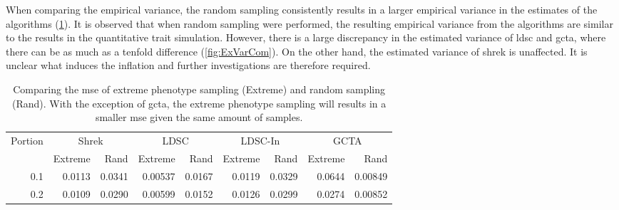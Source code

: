 \documentclass[12pt]{scrbook}
\begin{document}
When comparing the empirical variance, the random sampling consistently results in a larger empirical variance in the estimates of the algorithms (\cref{tab:ratioEx}).	
It is observed that when random sampling were performed, the resulting empirical variance from the algorithms are similar to the results in the quantitative trait simulation. 
However, there is a large discrepancy in the estimated variance of \gls{ldsc} and \gls{gcta}, where there can be as much as a tenfold difference (\cref{fig:ExVarCom}). 
On the other hand, the estimated variance of \gls{shrek} is unaffected.
It is unclear what induces the inflation and further investigations are therefore required.

\begin{table}[H]
	\centering
	\begin{tabular}{rrrrrrrrr}
		\toprule
		\multirow{2}[4]{*}{Portion} & \multicolumn{2}{c}{Shrek} & \multicolumn{2}{c}{LDSC} & \multicolumn{2}{c}{LDSC-In} & \multicolumn{2}{c}{GCTA} \\
		& Extreme & Rand & Extreme & Rand & Extreme & Rand & Extreme & Rand\\
		\midrule
		0.1   & 0.0113 & 0.0341 & 0.00537 & 0.0167 & 0.0119 & 0.0329 & 0.0644 & 0.00849 \\
		0.2   & 0.0109 & 0.0290 & 0.00599 & 0.0152 & 0.0126 & 0.0299 & 0.0274 & 0.00852 \\
		\bottomrule
	\end{tabular}
	\caption[Comparing the MSE of Extreme Phenotype Sampling and Random Sampling]{
		Comparing the \gls{mse} of extreme phenotype sampling (Extreme) and random sampling (Rand).
		With the exception of \gls{gcta}, the extreme phenotype sampling will results in a smaller \gls{mse} given the same amount of samples.
	}
	\label{tab:ratioEx}
\end{table}
\end{document}
